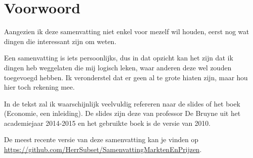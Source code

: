 \section*{Voorwoord}
Aangezien ik deze samenvatting niet enkel voor mezelf wil houden, eerst nog wat dingen die interessant zijn om weten.

Een samenvatting is iets persoonlijks, dus in dat opzicht kan het zijn dat ik dingen heb weggelaten die mij logisch leken, waar anderen deze wel zouden toegevoegd hebben. Ik veronderstel dat er geen al te grote hiaten zijn, maar hou hier toch rekening mee.

In de tekst zal ik waarschijnlijk veelvuldig refereren naar de slides of het boek (Economie, een inleiding). De slides zijn deze van professor De Bruyne uit het academiejaar 2014-2015 en het gebruikte boek is de versie van 2010.

De meest recente versie van deze samenvatting kan je vinden op \url{https://github.com/HerrSubset/SamenvattingMarktenEnPrijzen}.
